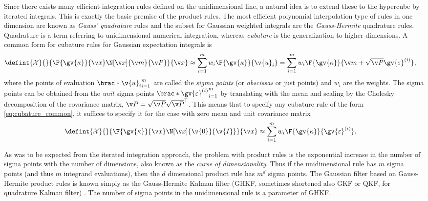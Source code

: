 Since there exists many efficient integration rules defined on the unidimensional line,
a natural idea is to extend these to the hypercube by iterated integrals. This is exactly the 
basic premise of the product rules. The most efficient polynomial interpolation type of rules
in one dimension are known as \emph{Gauss' quadrature} rules and the subset
for Gaussian weighted integrals are the \emph{Gauss-Hermite}
quadrature rules. Quadrature is a term referring to unidimensional numerical integration, whereas
\emph{cubature} is the generalization to higher dimensions. A common form for cubature rules for Gaussian
expectation integrals is
\begin{align}
	\defint{\mathcal{X}}{}{\F{\gv{\kappa}}{\x}\N[\x]{\m}{\P}}{\x} 
	&\approx \sum_{i=1}^m w_i\F{\gv{\kappa}}{\v{u}_i} \label{eq:cubature_common}
	= \sum_{i=1}^m w_i\F{\gv{\kappa}}{\m+\sqrt{\P}\gv{\varepsilon}^{(i)}},
\end{align}
where the points of evaluation $\brac*{\v{u}_i}_{i=1}^m$ are called the \emph{sigma points}
(or \emph{abscissas} or just points) and $w_i$ are the weights. The sigma points
can be obtained from the \emph{unit} sigma points $\brac*{\gv{\varepsilon}^{(i)}}_{i=1}^m$
by translating with the mean and scaling by the Cholesky decomposition of the covariance matrix,
$\P=\sqrt{\P}\sqrt{\P}^\tr$. This means that to specify any cubature rule of the form \eqref{eq:cubature_common}, it suffices
to specify it for the case with zero mean and unit covariance matrix
\begin{align}
	\defint{\mathcal{X}}{}{\F{\gv{\kappa}}{\x}\N[\x]{\v{0}}{\v{I}}}{\x} 
	&\approx \sum_{i=1}^m w_i\F{\gv{\kappa}}{\gv{\varepsilon}^{(i)}}.\label{eq:cubature_unit}
\end{align}


As was to be expected from the iterated integration approach,
the problem with product rules is the exponential increase in the number of sigma points with
the number of dimensions, also known as the \emph{curse of dimensionality}. Thus if the unidimensional rule has $m$ sigma points (and thus $m$ integrand evaluations),
then the $d$ dimensional product rule has $m^d$ sigma points.
The Gaussian filter based
on Gauss-Hermite product rules is known simply as the Gauss-Hermite Kalman filter (GHKF, sometimes shortened also GKF or QKF, for quadrature Kalman filter) \parencite{Ito2000}.
The number of sigma points in the unidimensional rule is a parameter of GHKF.

